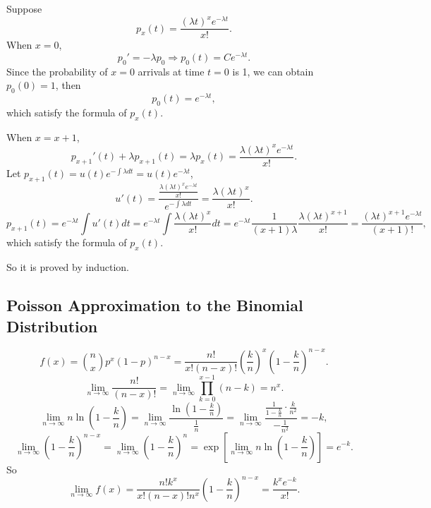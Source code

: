 \documentclass[11pt,a4paper]{article}
\begin{document}
Suppose $$p_x(t)=\frac{(\lambda t)^xe^{-\lambda t}}{x!}.$$
When $x=0$,
$$p_0'=-\lambda p_0\Longrightarrow p_0(t)=Ce^{-\lambda t}.$$
Since the probability of $x=0$ arrivals at time $t=0$ is 1, we can obtain $p_0(0)=1$, then
$$p_0(t)=e^{-\lambda t},$$
which satisfy the formula of $p_x(t)$.

When $x=x+1$,
$$p_{x+1}'(t)+\lambda p_{x+1}(t)=\lambda p_x(t)=\frac{\lambda(\lambda t)^xe^{-\lambda t}}{x!}.$$
Let $p_{x+1}(t)=u(t)e^{-\int\lambda dt}=u(t)e^{-\lambda t}$,
$$u'(t)=\frac{\frac{\lambda(\lambda t)^xe^{-\lambda t}}{x!}}{e^{-\int\lambda dt}}=\frac{\lambda(\lambda t)^x}{x!}.$$
$$p_{x+1}(t)=e^{-\lambda t}\int u'(t)dt=e^{-\lambda t}\int\frac{\lambda(\lambda t)^x}{x!}dt=e^{-\lambda t}\frac{1}{(x+1)\lambda}\frac{\lambda(\lambda t)^{x+1}}{x!}=\frac{(\lambda t)^{x+1}                                                                                                                                                                                                                              e^{-\lambda t}}{(x+1)!},$$
which satisfy the formula of $p_x(t)$.

So it is proved by induction.

\subsection{Poisson Approximation to the Binomial Distribution}

$$f(x)=\binom{n}{x}p^x(1-p)^{n-x}=\frac{n!}{x!(n-x)!}\left(\frac{k}{n}\right)^x\left(1-\frac{k}{n}\right)^{n-x}.$$
$$\lim_{n\to\infty}\frac{n!}{(n-x)!}=\lim_{n\to\infty}\prod_{k=0}^{x-1}(n-k)=n^x.$$
$$\lim_{n\to\infty}n\ln\left(1-\frac{k}{n}\right)=\lim_{n\to\infty}\frac{\ln\left(1-\frac{k}{n}\right)}{\frac{1}{n}}=\lim_{n\to\infty}\frac{\frac{1}{1-\frac{k}{n}}\cdot\frac{k}{n^2}}{-\frac{1}{n^2}}=-k,$$
$$\lim_{n\to\infty}\left(1-\frac{k}{n}\right)^{n-x}=\lim_{n\to\infty}\left(1-\frac{k}{n}\right)^n=\exp\left[{\lim_{n\to\infty}n\ln\left(1-\frac{k}{n}\right)}\right]=e^{-k}.$$
So $$\lim_{n\to\infty}f(x)=\frac{n!k^x}{x!(n-x)!n^x}\left(1-\frac{k}{n}\right)^{n-x}=\frac{k^xe^{-k}}{x!}.$$
\end{document}
